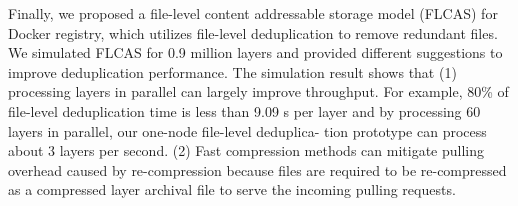 Finally, we proposed a file-level content addressable storage model (FLCAS) for Docker registry, which utilizes file-level deduplication to remove redundant files. 
%
We simulated FLCAS for 0.9 million layers and provided different suggestions to improve deduplication performance. The simulation result shows that (1) processing layers in parallel can largely improve throughput. For example, 80\% of file-level deduplication time is
less than 9.09 s per layer and by processing 60 layers in parallel, our one-node file-level deduplica-
tion prototype can process about 3 layers per second.
(2) Fast compression methods can mitigate pulling overhead caused by re-compression  because files are required to be re-compressed as a compressed layer archival file to serve the incoming pulling requests.



